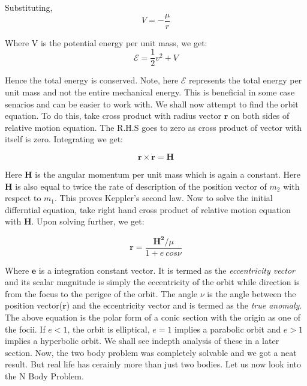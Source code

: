 \documentclass[12pt, letterpaper]{article}
\begin{document}
Substituting,
\begin{displaymath}
V = -\frac{\mu}{r}
\end{displaymath}

Where V is the potential energy per unit mass, we get:
\begin{displaymath}
\mathcal{E} = \frac{1}{2}v^2 + V
\end{displaymath}

Hence the total energy is conserved. Note, here $\mathcal{E}$ represents the total energy per unit mass and not the entire mechanical energy. This is beneficial in some case senarios and can be easier to work with. We shall now attempt to find the orbit equation. To do this, take cross product with radius vector $\mathbf{r}$ on both sides of relative motion equation. The R.H.S goes to zero as cross product of vector with itself is zero. Integrating we get:

\begin{displaymath}
\mathbf{r}\times\mathbf{\dot{r}} = \mathbf{H}
\end{displaymath}

Here \textbf{H} is the angular momentum per unit mass which is again a constant. Here \textbf{H} is also equal to twice the rate of description of the position vector of $m_2$ with respect to $m_1$. This proves Keppler's second law. Now to solve the initial differntial equation, take right hand cross product of relative motion equation with \textbf{H}. Upon solving further, we get:

\begin{displaymath}
\mathbf{r} = \frac{\mathbf{H^2}/\mu}{1 + e\:cos\nu}
\end{displaymath}

Where $\mathbf{e}$ is a integration constant vector. It is termed as the \textit{eccentricity vector} and its scalar magnitude is simply the eccentricity of the orbit while direction is from the focus to the perigee of the orbit. The angle $\nu$ is the angle between the position vector($\mathbf{r}$) and the eccentricity vector and is termed as the \textit{true anomaly}. The above equation is the polar form of a conic section with the origin as one of the focii. If $e < 1$, the orbit is elliptical, $e = 1$ implies a parabolic orbit and $e > 1$ implies a hyperbolic orbit. We shall see indepth analysis of these in a later section. Now, the two body problem was completely solvable and we got a neat result. But real life has cerainly more than just two bodies. Let us now look into the N Body Problem.
\end{document}
